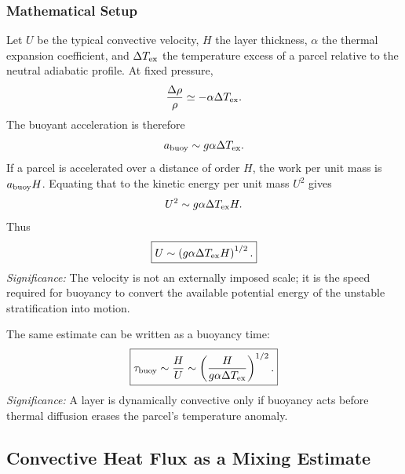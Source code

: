 \subsubsection*{Mathematical Setup}
Let $U$ be the typical convective velocity, $H$ the layer thickness, $\alpha$
the thermal expansion coefficient, and $\Delta T_{\rm ex}$ the temperature
excess of a parcel relative to the neutral adiabatic profile. At fixed
pressure,
\begin{equation}
    \frac{\Delta\rho}{\rho}
    \simeq
    -\alpha\Delta T_{\rm ex}.
    \label{eq:lec08:density-contrast}
\end{equation}
The buoyant acceleration is therefore
\begin{equation}
    a_{\rm buoy}
    \sim
    g\alpha\Delta T_{\rm ex}.
    \label{eq:lec08:buoyant-acceleration}
\end{equation}
If a parcel is accelerated over a distance of order $H$, the work per unit
mass is $a_{\rm buoy}H$. Equating that to the kinetic energy per unit mass
$U^2$ gives
\begin{equation}
    U^2\sim g\alpha\Delta T_{\rm ex}H.
    \label{eq:lec08:velocity-energy-balance}
\end{equation}
Thus
\begin{equation}
    \boxed{
    U\sim\left(g\alpha\Delta T_{\rm ex}H\right)^{1/2}.
    }
    \label{eq:lec08:convective-velocity}
\end{equation}
\textit{Significance:} The velocity is not an externally imposed scale; it is
the speed required for buoyancy to convert the available potential energy of
the unstable stratification into motion.

The same estimate can be written as a buoyancy time:
\begin{equation}
    \boxed{
    \tau_{\rm buoy}\sim\frac{H}{U}
    \sim
    \left(\frac{H}{g\alpha\Delta T_{\rm ex}}\right)^{1/2}.
    }
    \label{eq:lec08:buoyancy-time}
\end{equation}
\textit{Significance:} A layer is dynamically convective only if buoyancy acts
before thermal diffusion erases the parcel's temperature anomaly.

\subsection{Convective Heat Flux as a Mixing Estimate}
\label{sec:lec08:convective-flux}

